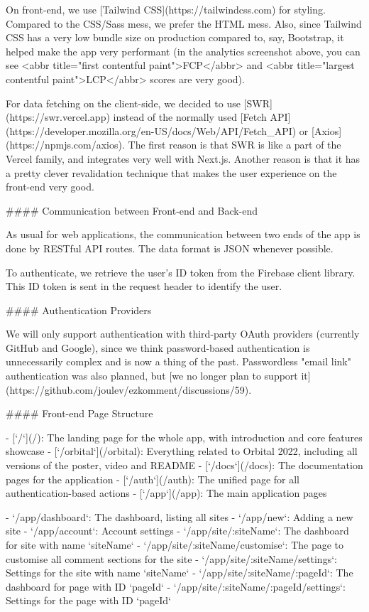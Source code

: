 \documentclass[11pt]{article}
\begin{document}
\begin{markdown}
On front-end, we use [Tailwind CSS](https://tailwindcss.com) for styling. Compared to the CSS/Sass mess, we prefer the HTML mess. Also, since Tailwind CSS has a very low bundle size on production compared to, say, Bootstrap, it helped make the app very performant (in the analytics screenshot above, you can see <abbr title="first contentful paint">FCP</abbr> and <abbr title="largest contentful paint">LCP</abbr> scores are very good).

For data fetching on the client-side, we decided to use [SWR](https://swr.vercel.app) instead of the normally used [Fetch API](https://developer.mozilla.org/en-US/docs/Web/API/Fetch_API) or [Axios](https://npmjs.com/axios). The first reason is that SWR is like a part of the Vercel family, and integrates very well with Next.js. Another reason is that it has a pretty clever revalidation technique that makes the user experience on the front-end very good.

#### Communication between Front-end and Back-end

As usual for web applications, the communication between two ends of the app is done by RESTful API routes. The data format is JSON whenever possible.

To authenticate, we retrieve the user's ID token from the Firebase client library. This ID token is sent in the request header to identify the user.

#### Authentication Providers

We will only support authentication with third-party OAuth providers (currently GitHub and Google), since we think password-based authentication is unnecessarily complex and is now a thing of the past. Passwordless "email link" authentication was also planned, but [we no longer plan to support it](https://github.com/joulev/ezkomment/discussions/59).

#### Front-end Page Structure

- [`/`](/): The landing page for the whole app, with introduction and core features showcase
- [`/orbital`](/orbital): Everything related to Orbital 2022, including all versions of the poster, video and README
- [`/docs`](/docs): The documentation pages for the application
- [`/auth`](/auth): The unified page for all authentication-based actions
- [`/app`](/app): The main application pages

  - `/app/dashboard`: The dashboard, listing all sites
  - `/app/new`: Adding a new site
  - `/app/account`: Account settings
  - `/app/site/:siteName`: The dashboard for site with name `siteName`
  - `/app/site/:siteName/customise`: The page to customise all comment sections for the site
  - `/app/site/:siteName/settings`: Settings for the site with name `siteName`
  - `/app/site/:siteName/:pageId`: The dashboard for page with ID `pageId`
  - `/app/site/:siteName/:pageId/settings`: Settings for the page with ID `pageId`


\end{markdown}
\end{document}
